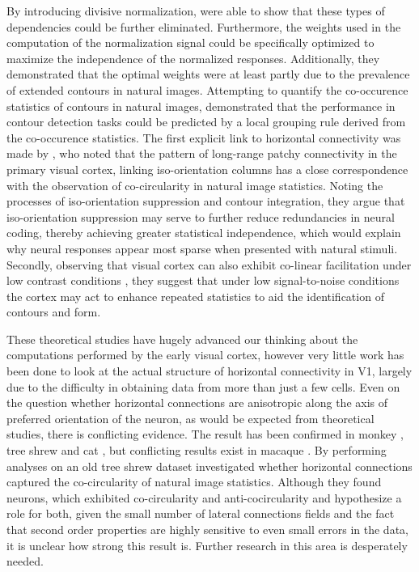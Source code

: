 By introducing divisive normalization, \cite{Schwartz2001a} were able
to show that these types of dependencies could be further
eliminated. Furthermore, the weights used in the computation of the
normalization signal could be specifically optimized to maximize the
independence of the normalized responses. Additionally, they
demonstrated that the optimal weights were at least partly due to the
prevalence of extended contours in natural images. Attempting to
quantify the co-occurence statistics of contours in natural images,
\cite{Geisler2001} demonstrated that the performance in contour
detection tasks could be predicted by a local grouping rule derived
from the co-occurence statistics. The first explicit link to
horizontal connectivity was made by \cite{Sigman2001}, who noted that
the pattern of long-range patchy connectivity in the primary visual
cortex, linking iso-orientation columns has a close correspondence with
the observation of co-circularity in natural image statistics. Noting
the processes of iso-orientation suppression and contour integration,
they argue that iso-orientation suppression may serve to further
reduce redundancies in neural coding, thereby achieving greater
statistical independence, which would explain why neural responses
appear most sparse when presented with natural stimuli. Secondly,
observing that visual cortex can also exhibit co-linear facilitation
under low contrast conditions \citep{Sceniak1999, Kapadia1999}, they
suggest that under low signal-to-noise conditions the cortex may act
to enhance repeated statistics to aid the identification of contours
and form.

These theoretical studies have hugely advanced our thinking about the
computations performed by the early visual cortex, however very little
work has been done to look at the actual structure of horizontal
connectivity in V1, largely due to the difficulty in obtaining data
from more than just a few cells. Even on the question whether
horizontal connections are anisotropic along the axis of preferred
orientation of the neuron, as would be expected from theoretical
studies, there is conflicting evidence. The result has been confirmed
in monkey \citep{Sincich2001}, tree shrew \citep{Bosking1997} and cat
\citep{Schmidt1997}, but conflicting results exist in macaque
\cite{Angelucci2002}. By performing analyses on an old tree shrew
dataset \cite{Hunt2011} investigated whether horizontal connections
captured the co-circularity of natural image statistics. Although they
found neurons, which exhibited co-circularity and anti-cocircularity
and hypothesize a role for both, given the small number of lateral
connections fields and the fact that second order properties are
highly sensitive to even small errors in the data, it is unclear how
strong this result is. Further research in this area is desperately
needed.

